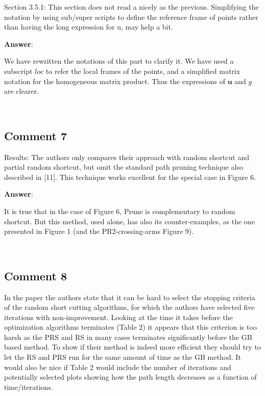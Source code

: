 \documentclass{scrartcl}
\begin{document}
Section 3.5.1:
This section does not read a nicely as the previous. Simplifying the notation by using sub/super scripts to define the reference frame of points rather than having the long expression for u, may help a bit.

\vspace{0.5cm}

\textbf{Answer}:

We have rewritten the notations of this part to clarify it. We have used a subscript $loc$ to refer the local frames of the points, and a simplified matrix notation for the homogeneous matrix product. Thus the expressions of $\mathbf{u}$ and $g$ are clearer.


\noindent
\hrulefill\\

\subsection{Comment 7}

Results:
The authors only compares their approach with random shortcut and partial random shortcut, but omit the standard path pruning technique also described in [11]. This technique works excellent for the special case in Figure 6. 

\vspace{0.5cm}

\textbf{Answer}:

It is true that in the case of Figure 6, Prune is complementary to random shortcut. But this method, used alone, has also its counter-examples, as the one presented in Figure 1 (and the PR2-crossing-arms Figure 9).

\noindent
\hrulefill\\

\subsection{Comment 8}

In the paper the authors state that it can be hard to select the stopping criteria of the random short cutting algorithms, for which the authors have selected five iterations with non-improvement. Looking at the time it takes before the optimization algorithms terminates (Table 2) it appears that this criterion is too harsh as the PRS and RS in many cases terminates significantly before the GB based method. To show if their method is indeed more efficient they should try to let the RS and PRS run for the same amount of time as the GB method. It would also be nice if Table 2 would include the number of iterations and potentially selected plots showing how the path length decreases as a function of time/iterations.
\end{document}
